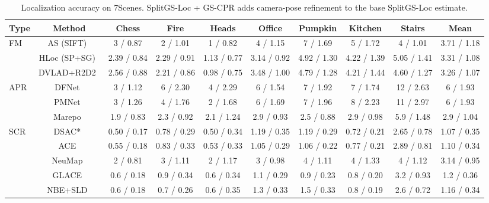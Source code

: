 \begin{table}[tp]
\centering
\footnotesize
\setlength{\tabcolsep}{2.5pt}
\setlength{\tabcolsep}{1.5pt}
\renewcommand{\arraystretch}{1.1}
\caption{Localization accuracy on 7Scenes. SplitGS-Loc + GS-CPR adds camera-pose refinement to the base SplitGS-Loc estimate.}
\label{tab:t2}
\begin{tabular}{lccccccccc}
\toprule
Type & Method & Chess & Fire & Heads & Office & Pumpkin & Kitchen & Stairs & Mean \\
\midrule
FM & AS (SIFT)~\cite{reported260504730v1bibbib55} & 3 / 0.87 & 2 / 1.01 & 1 / 0.82 & 4 / 1.15 & 7 / 1.69 & 5 / 1.72 & 4 / 1.01 & 3.71 / 1.18 \\
 & HLoc (SP+SG)~\cite{sarlin2019hloc} & 2.39 / 0.84 & 2.29 / 0.91 & 1.13 / 0.77 & 3.14 / 0.92 & 4.92 / 1.30 & 4.22 / 1.39 & 5.05 / 1.41 & 3.31 / 1.08 \\
 & DVLAD+R2D2~\cite{reported260504730v1bibbib56} & 2.56 / 0.88 & 2.21 / 0.86 & 0.98 / 0.75 & 3.48 / 1.00 & 4.79 / 1.28 & 4.21 / 1.44 & 4.60 / 1.27 & 3.26 / 1.07 \\
\midrule
APR & DFNet~\cite{reported260504730v1bibbib26} & 3 / 1.12 & 6 / 2.30 & 4 / 2.29 & 6 / 1.54 & 7 / 1.92 & 7 / 1.74 & 12 / 2.63 & 6 / 1.93 \\
 & PMNet~\cite{reported260504730v1bibbib28} & 3 / 1.26 & 4 / 1.76 & 2 / 1.68 & 6 / 1.69 & 7 / 1.96 & 8 / 2.23 & 11 / 2.97 & 6 / 1.93 \\
 & Marepo~\cite{reported260504730v1bibbib24} & 1.9 / 0.83 & 2.3 / 0.92 & 2.1 / 1.24 & 2.9 / 0.93 & 2.5 / 0.88 & 2.9 / 0.98 & 5.9 / 1.48 & 2.9 / 1.04 \\
\midrule
SCR & DSAC*~\cite{brachmann2021dsacstar} & 0.50 / 0.17 & 0.78 / 0.29 & 0.50 / 0.34 & 1.19 / 0.35 & 1.19 / 0.29 & 0.72 / 0.21 & 2.65 / 0.78 & 1.07 / 0.35 \\
 & ACE~\cite{brachmann2023ace} & 0.55 / 0.18 & 0.83 / 0.33 & 0.53 / 0.33 & 1.05 / 0.29 & 1.06 / 0.22 & 0.77 / 0.21 & 2.89 / 0.81 & 1.10 / 0.34 \\
 & NeuMap~\cite{reported260504730v1bibbib7} & 2 / 0.81 & 3 / 1.11 & 2 / 1.17 & 3 / 0.98 & 4 / 1.11 & 4 / 1.33 & 4 / 1.12 & 3.14 / 0.95 \\
 & GLACE~\cite{reported260504730v1bibbib37} & 0.6 / 0.18 & 0.9 / 0.34 & 0.6 / 0.34 & 1.1 / 0.29 & 0.9 / 0.23 & 0.8 / 0.20 & 3.2 / 0.93 & 1.2 / 0.36 \\
 & NBE+SLD~\cite{reported250319358v1bibbib15} & 0.6 / 0.18 & 0.7 / 0.26 & 0.6 / 0.35 & 1.3 / 0.33 & 1.5 / 0.33 & 0.8 / 0.19 & 2.6 / 0.72 & 1.16 / 0.34 \\

\end{tabular}
\end{table}
